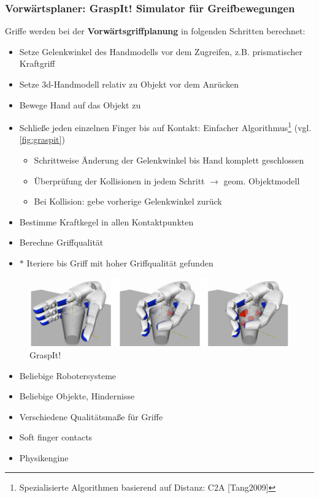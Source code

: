 \subsubsection*{Vorwärtsplaner: GraspIt! Simulator für Greifbewegungen}
Griffe werden bei der \textbf{Vorwärtsgriffplanung} in folgenden Schritten berechnet:
\begin{itemize}
\item[1.] Setze Gelenkwinkel des Handmodells vor dem Zugreifen, z.B. prismatischer Kraftgriff
\item[2.] Setze 3d-Handmodell relativ zu Objekt vor dem Anrücken
\item[3.] Bewege Hand auf das Objekt zu
\item[4.] Schließe jeden einzelnen Finger bis auf Kontakt: Einfacher Algorithmus\footnote{Spezialisierte Algorithmen basierend auf Distanz: C2A [Tang2009]} (vgl. \autoref{fig:graspit})
\begin{itemize}
\item[1.] Schrittweise Änderung der Gelenkwinkel bis Hand komplett geschlossen
\item[2.] Überprüfung der Kollisionen in jedem Schritt $\rightarrow$ geom. Objektmodell
\item[3.] Bei Kollision: gebe vorherige Gelenkwinkel zurück
\end{itemize}
\item[5.] Bestimme Kraftkegel in allen Kontaktpunkten
\item[6.] Berechne Griffqualität
\item[7.] $\ast$ Iteriere bis Griff mit hoher Griffqualität gefunden
\end{itemize}
\newpage
\begin{figure}[h!]
	\centering
	\includegraphics[width=.7\textwidth]{figures/ch04_graspit.png}
	\caption{GraspIt!}
	\label{fig:graspit}
\end{figure}
\begin{itemize}
\item Beliebige Robotersysteme
\item Beliebige Objekte, Hindernisse
\item Verschiedene Qualitätsmaße für Griffe
\item Soft finger contacts
\item Physikengine
\end{itemize}
